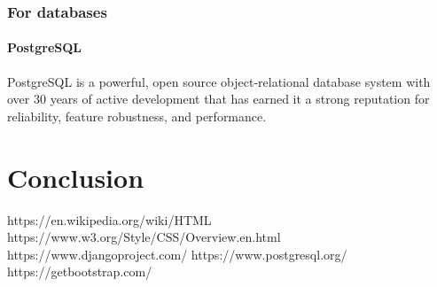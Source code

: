 \documentclass[12pt,a4paper]{article}
\begin{document}
	\subsubsection{For databases}
	\paragraph{PostgreSQL}
	PostgreSQL is a powerful, open source object-relational database system with over 30 years of active development that has earned it a strong reputation for reliability, feature robustness, and performance.\cite{PostgreSQL}
	\clearpage
	\section{Conclusion}
	
	\clearpage
	\begin{thebibliography}{9}
		https://en.wikipedia.org/wiki/HTML
		https://www.w3.org/Style/CSS/Overview.en.html
		https://www.djangoproject.com/
		https://www.postgresql.org/
		https://getbootstrap.com/
	\end{thebibliography}
	
\end{document}
